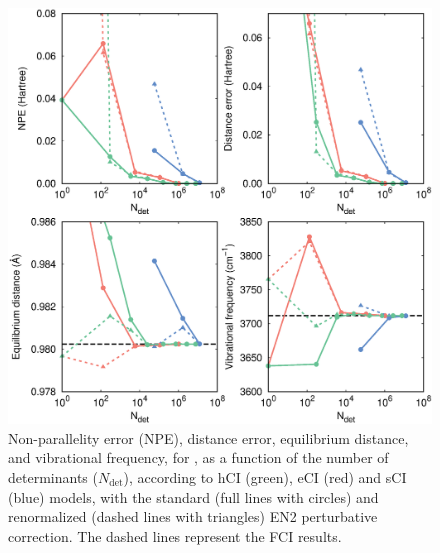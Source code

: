 \documentclass[aip,jcp,preprint,noshowkeys,superscriptaddress]{revtex4-1}
\newcommand{\Ndet}{N_\text{det}}
\begin{document}
\begin{figure}%
\includegraphics[width=1.0\linewidth]{plot_pt2_rpt2_OH}
\caption{
Non-parallelity error (NPE), distance error, equilibrium distance, and vibrational frequency, for ,
as a function of the number of determinants ($\Ndet$), according to hCI (green), eCI (red) and sCI (blue) models,
with the standard (full lines with circles) and renormalized (dashed lines with triangles) EN2 perturbative correction.
The dashed lines represent the FCI results.}
\label{fig:plot_pt2_rpt2_oh}
\end{figure}
\end{document}
